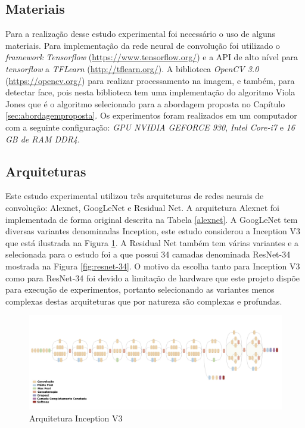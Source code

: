 \subsection{Materiais}\label{sec:material}
Para a realização desse estudo experimental foi necessário o uso de alguns materiais. Para implementação da rede neural de convolução foi utilizado o \textit{framework Tensorflow} (\url{https://www.tensorflow.org/}) e a API de alto nível para \textit{tensorflow} a \textit{TFLearn} (\url{http://tflearn.org/}). A biblioteca \textit{OpenCV 3.0} (\url{https://opencv.org/}) para realizar processamento na imagem, e também, para detectar face, pois nesta biblioteca tem uma implementação do algoritmo Viola Jones que é o algoritmo selecionado para a abordagem proposta no Capítulo \ref{sec:abordagemproposta}.
Os experimentos foram realizados em um computador com a seguinte configuração: \textit{GPU NVIDIA GEFORCE 930}, \textit{Intel Core-i7} e \textit{16 GB de RAM DDR4}. 


\subsection{Arquiteturas}
Este estudo experimental utilizou três arquiteturas de redes neurais de convolução: Alexnet, GoogLeNet e Residual Net. A arquitetura Alexnet foi implementada de forma original descrita na Tabela \ref{alexnet}.  A GoogLeNet tem diversas variantes denominadas Inception, este estudo considerou a Inception V3 que está ilustrada na Figura \ref{fig:inceptionV3}. A Residual Net também tem várias variantes e a selecionada para o estudo foi a que possui 34 camadas denominada ResNet-34 mostrada na Figura \ref{fig:resnet-34}. O motivo da escolha tanto para Inception V3 como para ResNet-34  
foi devido a limitação de hardware que este projeto dispõe para execução de experimentos, portanto selecionando as variantes menos complexas destas arquiteturas que por natureza são complexas e profundas. 

\begin{figure}
\centering
\includegraphics[scale=0.33]{figuras/inceptionV3.png}
\caption{Arquitetura Inception V3}
\label{fig:inceptionV3}
\end{figure}

